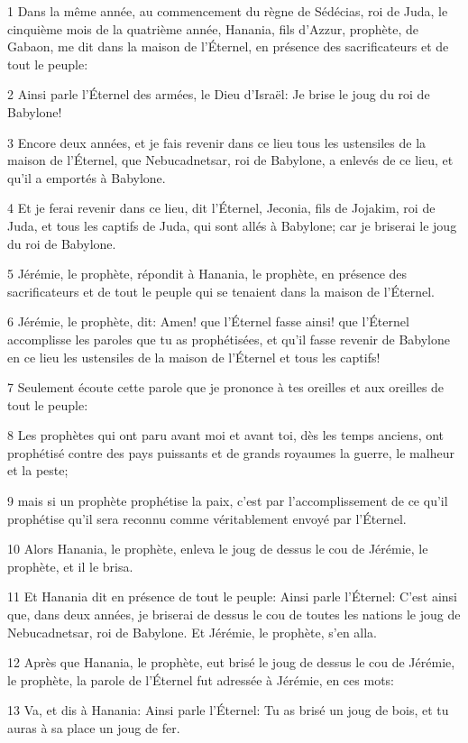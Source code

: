 \par 1 Dans la même année, au commencement du règne de Sédécias, roi de Juda, le cinquième mois de la quatrième année, Hanania, fils d'Azzur, prophète, de Gabaon, me dit dans la maison de l'Éternel, en présence des sacrificateurs et de tout le peuple:
\par 2 Ainsi parle l'Éternel des armées, le Dieu d'Israël: Je brise le joug du roi de Babylone!
\par 3 Encore deux années, et je fais revenir dans ce lieu tous les ustensiles de la maison de l'Éternel, que Nebucadnetsar, roi de Babylone, a enlevés de ce lieu, et qu'il a emportés à Babylone.
\par 4 Et je ferai revenir dans ce lieu, dit l'Éternel, Jeconia, fils de Jojakim, roi de Juda, et tous les captifs de Juda, qui sont allés à Babylone; car je briserai le joug du roi de Babylone.
\par 5 Jérémie, le prophète, répondit à Hanania, le prophète, en présence des sacrificateurs et de tout le peuple qui se tenaient dans la maison de l'Éternel.
\par 6 Jérémie, le prophète, dit: Amen! que l'Éternel fasse ainsi! que l'Éternel accomplisse les paroles que tu as prophétisées, et qu'il fasse revenir de Babylone en ce lieu les ustensiles de la maison de l'Éternel et tous les captifs!
\par 7 Seulement écoute cette parole que je prononce à tes oreilles et aux oreilles de tout le peuple:
\par 8 Les prophètes qui ont paru avant moi et avant toi, dès les temps anciens, ont prophétisé contre des pays puissants et de grands royaumes la guerre, le malheur et la peste;
\par 9 mais si un prophète prophétise la paix, c'est par l'accomplissement de ce qu'il prophétise qu'il sera reconnu comme véritablement envoyé par l'Éternel.
\par 10 Alors Hanania, le prophète, enleva le joug de dessus le cou de Jérémie, le prophète, et il le brisa.
\par 11 Et Hanania dit en présence de tout le peuple: Ainsi parle l'Éternel: C'est ainsi que, dans deux années, je briserai de dessus le cou de toutes les nations le joug de Nebucadnetsar, roi de Babylone. Et Jérémie, le prophète, s'en alla.
\par 12 Après que Hanania, le prophète, eut brisé le joug de dessus le cou de Jérémie, le prophète, la parole de l'Éternel fut adressée à Jérémie, en ces mots:
\par 13 Va, et dis à Hanania: Ainsi parle l'Éternel: Tu as brisé un joug de bois, et tu auras à sa place un joug de fer.
